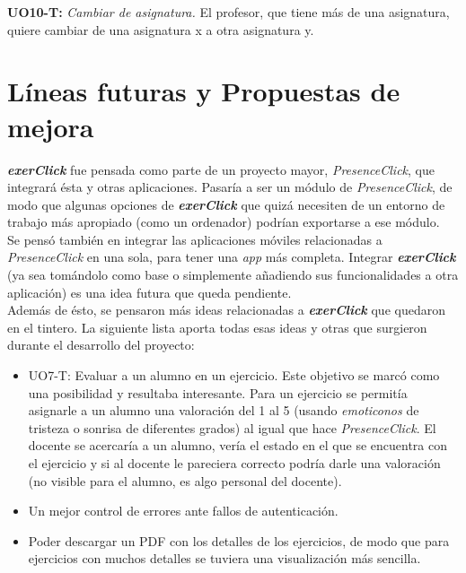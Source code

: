 \textbf{UO10-T:} \textit{Cambiar de asignatura.} El profesor, que tiene más de una asignatura, quiere cambiar de una asignatura x a otra asignatura y.\\

\section{Líneas futuras y Propuestas de mejora}

\textit{\textbf{exerClick}} fue pensada como parte de un proyecto mayor, \textit{PresenceClick}, que integrará ésta y otras aplicaciones. Pasaría a ser un módulo de \textit{PresenceClick}, de modo que algunas opciones de \textit{\textbf{exerClick}} que quizá necesiten de un entorno de trabajo más apropiado (como un ordenador) podrían exportarse a ese módulo.\\

Se pensó también en integrar las aplicaciones móviles relacionadas a \textit{PresenceClick} en una sola, para tener una \textit{app} más completa. Integrar \textit{\textbf{exerClick}} (ya sea tomándolo como base o simplemente añadiendo sus funcionalidades a otra aplicación) es una idea futura que queda pendiente.\\

Además de ésto, se pensaron más ideas relacionadas a \textit{\textbf{exerClick}} que quedaron en el tintero. La siguiente lista aporta todas esas ideas y otras que surgieron durante el desarrollo del proyecto:

\begin{itemize}
\item UO7-T: Evaluar a un alumno en un ejercicio. Este objetivo se marcó como una posibilidad y resultaba interesante. Para un ejercicio se permitía asignarle a un alumno una valoración del 1 al 5 (usando \textit{emoticonos} de tristeza o sonrisa de diferentes grados) al igual que hace \textit{PresenceClick}. El docente se acercaría a un alumno, vería el estado en el que se encuentra con el ejercicio y si al docente le pareciera correcto podría darle una valoración (no visible para el alumno, es algo personal del docente).

\item Un mejor control de errores ante fallos de autenticación.

\item Poder descargar un PDF con los detalles de los ejercicios, de modo que para ejercicios con muchos detalles se tuviera una visualización más sencilla.
\end{itemize}

